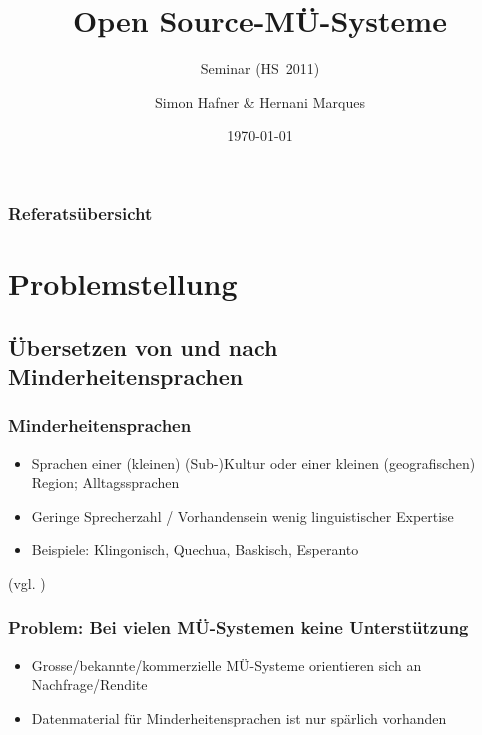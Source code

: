 \documentclass{beamer}
\title{Open Source-MÜ-Systeme}
\subtitle{Seminar \q{Maschinelle \"Ubersetzung} (HS~2011)}
\author{Simon Hafner \& Hernani Marques}
\date{\today}
\begin{document}
  \maketitle

\begin{frame}
\frametitle{Referatsübersicht}
\tableofcontents
\end{frame}

\section{Problemstellung}
\subsection{Übersetzen von und nach Minderheitensprachen}
\begin{frame}
\frametitle{Minderheitensprachen}
\begin{itemize}
\item Sprachen einer (kleinen) (Sub-)Kultur oder einer kleinen (geografischen) Region; Alltagssprachen
\item Geringe Sprecherzahl / Vorhandensein wenig linguistischer Expertise
\item Beispiele: Klingonisch, Quechua, Baskisch, Esperanto
\end{itemize}
(vgl. \cite{forcada})
\end{frame}
\begin{frame}
\frametitle{Problem: Bei vielen MÜ-Systemen keine Unterstützung}
\begin{itemize}
\item Grosse/bekannte/kommerzielle MÜ-Systeme orientieren sich an Nachfrage/Rendite
\item Datenmaterial für Minderheitensprachen ist nur spärlich vorhanden
\end{itemize}
\end{frame}
\end{document}
